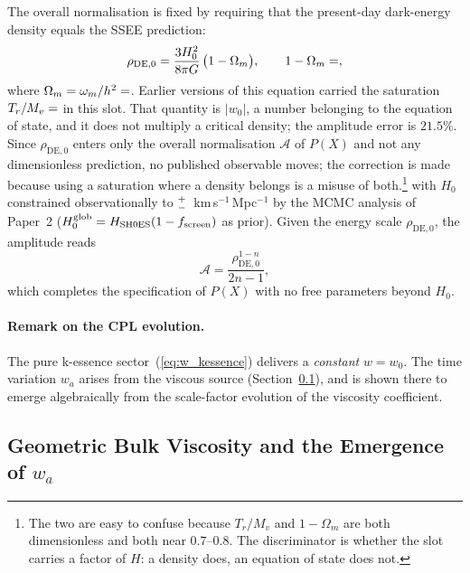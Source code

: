 The overall normalisation is fixed by requiring that the present-day
dark-energy density equals the SSEE prediction:
%
\begin{equation}
  \rho_{\mathrm{DE},0}
    = \frac{3H_{0}^{2}}{8\pi G}\,\bigl(1-\Omega_m\bigr),
  \qquad 1-\Omega_m = \val{OMDE_DENS_d6},
  \label{eq:rho_de0}
\end{equation}
%
where $\Omega_m = \omega_m/h^2 = \val{OMEGA_M_TOTAL_d6}$.  Earlier versions of this
equation carried the saturation $T_{r}/M_{v} = \val{S_DE_d6}$ in this slot.  That
quantity is $|w_0|$, a number belonging to the equation of state, and it does
not multiply a critical density; the amplitude error is $21.5\%$.  Since
$\rho_{\mathrm{DE},0}$ enters only the overall normalisation
$\mathcal{A}$ of $P(X)$ and not any dimensionless prediction, no published
observable moves; the correction is made because using a saturation where a
density belongs is a misuse of both.\footnote{The two are easy to confuse
because $T_r/M_v$ and $1-\Omega_m$ are both dimensionless and both near
$0.7$--$0.8$.  The discriminator is whether the slot carries a factor of
$H$: a density does, an equation of state does not.}
%
with $H_{0}$ constrained observationally to
$\val{h0_p2}^{+\val{h0_p2_mas}}_{-\val{h0_p2_menos}}$~km\,s$^{-1}$\,Mpc$^{-1}$ by the MCMC analysis of
Paper~2 ($H_0^{\rm glob}=H_{\rm SH0ES}(1-f_{\rm screen})$ as prior).  Given the energy scale $\rho_{\mathrm{DE},0}$, the amplitude reads
%
\begin{equation}
  \mathcal{A}
    = \frac{\rho_{\mathrm{DE},0}^{1-n}}{2n-1},
  \label{eq:amplitude}
\end{equation}
%
which completes the specification of $P(X)$ with no free parameters beyond $H_{0}$.

\paragraph{Remark on the CPL evolution.}
The pure k-essence sector~(\ref{eq:w_kessence}) delivers a \emph{constant}
$w = w_{0}$.  The time variation $w_{a}$ arises from the viscous source
(Section~\ref{sec:eft:viscosity}), and is shown there to emerge algebraically
from the scale-factor evolution of the viscosity coefficient.

\subsection{Geometric Bulk Viscosity and the Emergence of \texorpdfstring{$w_a$}{wa}}
\label{sec:eft:viscosity}

